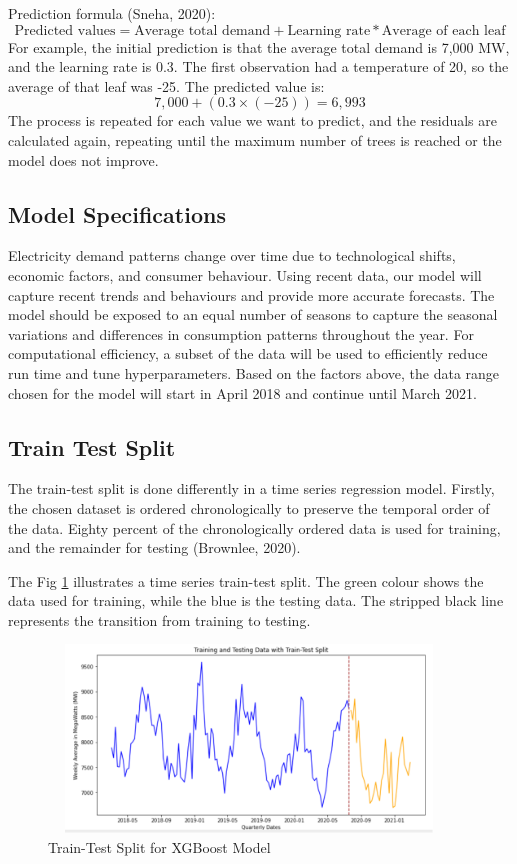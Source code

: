 \documentclass[mstat,12pt]{unswthesis}
\begin{document}
Prediction formula (Sneha, 2020): \[
\text{Predicted values} = \text{Average total demand} + \text{Learning rate} * \text{Average of each leaf}
\] For example, the initial prediction is that the average total demand
is 7,000 MW, and the learning rate is 0.3. The first observation had a
temperature of 20, so the average of that leaf was -25. The predicted
value is: \[
7,000 + (0.3 \times (-25)) = 6,993
\] The process is repeated for each value we want to predict, and the
residuals are calculated again, repeating until the maximum number of
trees is reached or the model does not improve.

\subsection{Model Specifications}\label{model-specifications}

Electricity demand patterns change over time due to technological
shifts, economic factors, and consumer behaviour. Using recent data, our
model will capture recent trends and behaviours and provide more
accurate forecasts. The model should be exposed to an equal number of
seasons to capture the seasonal variations and differences in
consumption patterns throughout the year. For computational efficiency,
a subset of the data will be used to efficiently reduce run time and
tune hyperparameters. Based on the factors above, the data range chosen
for the model will start in April 2018 and continue until March 2021.

\subsection{Train Test Split}\label{train-test-split}

The train-test split is done differently in a time series regression
model. Firstly, the chosen dataset is ordered chronologically to
preserve the temporal order of the data. Eighty percent of the
chronologically ordered data is used for training, and the remainder for
testing (Brownlee, 2020).

The Fig \ref{traintest} illustrates a time series train-test split. The
green colour shows the data used for training, while the blue is the
testing data. The stripped black line represents the transition from
training to testing.

\begin{figure}[H]
\centering
\includegraphics[width=0.95\textwidth, height=5cm]{traintest.png}
\caption{Train-Test Split for XGBoost Model}\label{traintest}
\end{figure}
\end{document}
